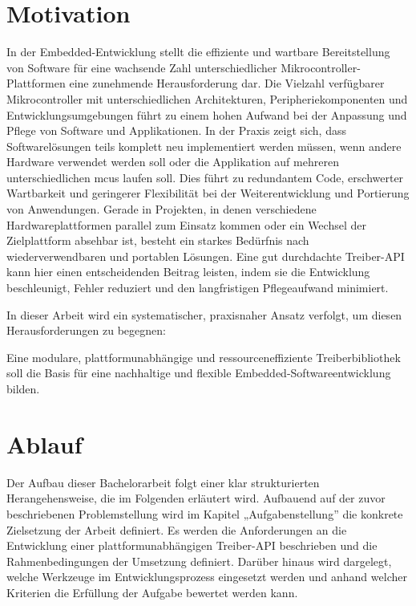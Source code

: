 \section{Motivation}
In der Embedded-Entwicklung stellt die effiziente und wartbare Bereitstellung von Software für eine wachsende Zahl unterschiedlicher Mikrocontroller-Plattformen eine zunehmende Herausforderung dar.
Die Vielzahl verfügbarer Mikrocontroller mit unterschiedlichen Architekturen, Peripheriekomponenten und Entwicklungsumgebungen führt zu einem hohen Aufwand bei der Anpassung und Pflege von Software und Applikationen.
In der Praxis zeigt sich, dass Softwarelösungen teils komplett neu implementiert werden müssen, wenn andere Hardware verwendet werden soll oder die Applikation auf mehreren unterschiedlichen \gls{mcus} laufen soll.
Dies führt zu redundantem Code, erschwerter Wartbarkeit und geringerer Flexibilität bei der Weiterentwicklung und Portierung von Anwendungen.
Gerade in Projekten, in denen verschiedene Hardwareplattformen parallel zum Einsatz kommen oder ein Wechsel der Zielplattform absehbar ist, besteht ein starkes Bedürfnis nach wiederverwendbaren und portablen Lösungen. Eine gut durchdachte Treiber-API kann hier einen entscheidenden Beitrag leisten, indem sie die Entwicklung beschleunigt, Fehler reduziert und den langfristigen Pflegeaufwand minimiert. 
 
In dieser Arbeit wird ein systematischer, praxisnaher Ansatz verfolgt, um diesen Herausforderungen zu begegnen:

Eine modulare, plattformunabhängige und ressourceneffiziente Treiberbibliothek soll die Basis für eine nachhaltige und flexible Embedded-Softwareentwicklung bilden. 


\section{Ablauf}
Der Aufbau dieser Bachelorarbeit folgt einer klar strukturierten Herangehensweise, die im Folgenden erläutert wird. 
Aufbauend auf der zuvor beschriebenen Problemstellung wird im Kapitel „Aufgabenstellung” die konkrete Zielsetzung der Arbeit definiert.
Es werden die Anforderungen an die Entwicklung einer plattformunabhängigen Treiber-API beschrieben und die Rahmenbedingungen der Umsetzung definiert.
Darüber hinaus wird dargelegt, welche Werkzeuge im Entwicklungsprozess eingesetzt werden und anhand welcher Kriterien die Erfüllung der Aufgabe bewertet werden kann.


